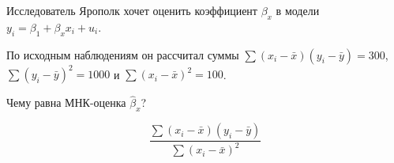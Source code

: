 
\begin{question}
Исследователь Ярополк хочет оценить коэффициент \(\beta_x\) в модели \(y_i = \beta_1 + \beta_x x_i + u_i\).

По исходным наблюдениям
он рассчитал суммы \(\sum (x_i - \bar x)(y_i - \bar y)=300\), \(\sum (y_i - \bar y)^2=1000\) и \(\sum (x_i - \bar x)^2=100\).

Чему равна МНК-оценка \(\hat\beta_x\)?
\end{question}

\begin{solution}
\[\frac{\sum (x_i - \bar x)(y_i - \bar y)}{\sum (x_i - \bar x)^2}\]
\end{solution}


